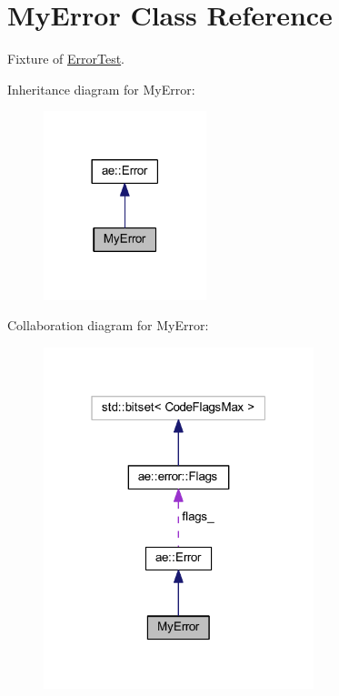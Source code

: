 \hypertarget{class_my_error}{}\section{My\+Error Class Reference}
\label{class_my_error}


Fixture of \hyperlink{class_error_test}{Error\+Test}.  




Inheritance diagram for My\+Error\+:
\nopagebreak
\begin{figure}[H]
\begin{center}
\leavevmode
\includegraphics[width=134pt]{class_my_error__inherit__graph}
\end{center}
\end{figure}


Collaboration diagram for My\+Error\+:
\nopagebreak
\begin{figure}[H]
\begin{center}
\leavevmode
\includegraphics[width=223pt]{class_my_error__coll__graph}
\end{center}
\end{figure}
